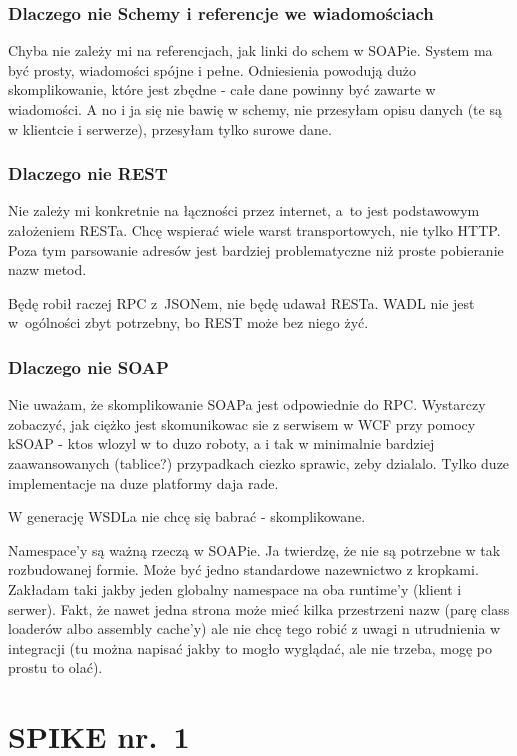 \subsubsection{Dlaczego nie Schemy i referencje we wiadomościach}
Chyba nie zależy mi na referencjach, jak linki do schem w SOAPie. System ma być prosty, wiadomości spójne i pełne. Odniesienia powodują dużo skomplikowanie, które jest zbędne - całe dane powinny być zawarte w wiadomości. A no i ja się nie bawię w schemy, nie przesyłam opisu danych (te są w klientcie i serwerze), przesyłam tylko surowe dane.

\subsubsection{Dlaczego nie REST}
Nie zależy mi konkretnie na łączności przez internet, a~to jest podstawowym założeniem RESTa.
Chcę wspierać wiele warst transportowych, nie tylko HTTP. Poza tym parsowanie adresów jest bardziej problematyczne niż proste pobieranie nazw metod.

Będę robił raczej RPC z~JSONem, nie będę udawał RESTa.
WADL nie jest w~ogólności zbyt potrzebny, bo REST może bez niego żyć.

\subsubsection{Dlaczego nie SOAP}
Nie uważam, że skomplikowanie SOAPa jest odpowiednie do RPC\@. Wystarczy zobaczyć, jak ciężko jest skomunikowac sie z serwisem w WCF przy pomocy kSOAP - ktos wlozyl w to duzo roboty, a i tak w minimalnie bardziej zaawansowanych (tablice?) przypadkach ciezko sprawic, zeby dzialalo. Tylko duze implementacje na duze platformy daja rade.

W generację WSDLa nie chcę się babrać - skomplikowane.

Namespace'y są ważną rzeczą w SOAPie. Ja twierdzę, że nie są potrzebne w tak rozbudowanej formie. Może być jedno standardowe nazewnictwo z kropkami. Zakładam taki jakby jeden globalny namespace na oba runtime'y (klient i serwer). Fakt, że nawet jedna strona może mieć kilka przestrzeni nazw (parę class loaderów albo assembly cache'y) ale nie chcę tego robić z uwagi n utrudnienia w integracji (tu można napisać jakby to mogło wyglądać, ale nie trzeba, mogę po prostu to olać).

\section{SPIKE nr.\ 1}



